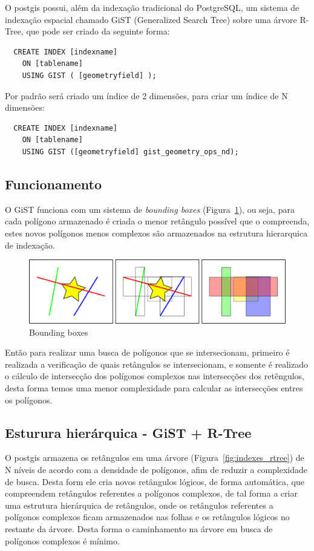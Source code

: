\documentclass[12pt]{article}
\begin{document}
O postgis possui, além da indexação tradicional do PostgreSQL, um sistema de
indexação espacial chamado GiST (Generalized Search Tree) sobre uma
árvore R-Tree, que pode ser criado da seguinte forma:
\begin{verbatim}
  CREATE INDEX [indexname]
    ON [tablename]
    USING GIST ( [geometryfield] );
\end{verbatim}

Por padrão será criado um índice de 2 dimensões, para criar um índice de N dimensões:
\begin{verbatim}
  CREATE INDEX [indexname]
    ON [tablename]
    USING GIST ([geometryfield] gist_geometry_ops_nd);
\end{verbatim}

\subsection{Funcionamento}
O GiST funciona com um sistema de \textit{bounding boxes} (Figura~\ref{fig:indexes_bbox}),
ou seja, para cada polígono armazenado é criada o menor retângulo possível que o
compreenda, estes novos polígonos menos complexos são armazenados na estrutura hierarquica
de indexação.

\begin{figure}[ht]
  \centering
  \includegraphics[width=1\textwidth]{indexes_bbox.png}
  \caption{Bounding boxes}
  \label{fig:indexes_bbox}
\end{figure}

Então para realizar uma busca de polígonos que se intersecionam, primeiro é realizada a
verificação de quais retângulos se intersecionam, e somente é realizado o cálculo de
intersecção dos polígonos complexos nas intersecções dos retêngulos, desta forma temos uma
menor complexidade para calcular as intersecções entres os polígonos.

\subsection{Esturura hierárquica - GiST + R-Tree}
O postgis armazena os retângulos em uma árvore (Figura~\ref{fig:indexes_rtree}) de N
níveis de acordo com a densidade de polígonos, afim de reduzir a complexidade de busca.
Desta form ele cria novos retângulos lógicos, de forma automática, que compreendem
retângulos referentes a polígonos complexos, de tal forma a criar uma estrutura hierárquica
de retângulos, onde os retângulos referentes a polígonos complexos ficam armazenados nas
folhas e os retângulos lógicos no restante da árvore. Desta forma o caminhamento na árvore
em busca de polígonos complexos é mínimo.
\end{document}
